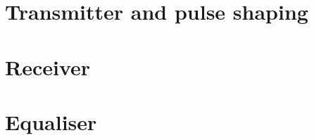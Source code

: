 \documentclass{article}
\begin{document}
\newpage

\tableofcontents

\newpage

\section{Transmitter and pulse shaping}


\section{Receiver}


\section{Equaliser}

\end{document}
